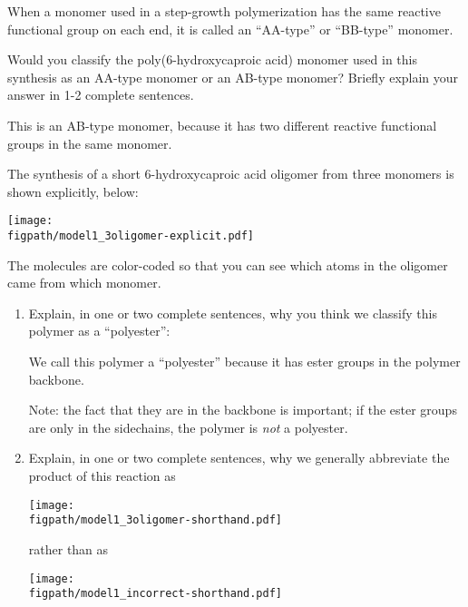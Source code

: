 \begin{activity}
\begin{infobox}
	When a monomer used in a step-growth polymerization has the same reactive functional group on each end, it is called an ``AA-type'' or ``BB-type'' monomer.

\end{infobox}

\begin{ctqs}
		
		\question Would you classify the poly(6-hydroxycaproic acid) monomer used in this synthesis as an AA-type monomer or an AB-type monomer?  Briefly explain your answer in 1-2 complete sentences.
			
				\begin{solution}[1.25in]
					This is an AB-type monomer, because it has two different reactive functional groups in the same monomer.
				\end{solution}
		
		\question The synthesis of a short 6-hydroxycaproic acid oligomer from three monomers is shown explicitly, below: \label{ctq:6hcpa-oligomer}
	
\vspace{0.25in}	\centerline{\texttt{[image: \\figpath/model1\_3oligomer-explicit.pdf]}}
The molecules are color-coded so that you can see which atoms in the oligomer came from which monomer.
		
		\begin{enumerate}
		
			\item Explain, in one or two complete sentences, why you think we classify this polymer as a ``polyester'':
			
				\begin{solution}[2in]
					We call this polymer a ``polyester'' because it has ester groups in the polymer backbone.
					
					Note: the fact that they are in the backbone is important; if the ester groups are only in the sidechains, the polymer is \emph{not} a polyester.
				\end{solution}
		
			\item Explain, in one or two complete sentences, why we generally abbreviate the product of this reaction as
	
	\centerline{\texttt{[image: \\figpath/model1\_3oligomer-shorthand.pdf]}}
	
	rather than as
	
	\centerline{\texttt{[image: \\figpath/model1\_incorrect-shorthand.pdf]}}
			

\end{enumerate}
\end{ctqs}
\end{activity}
